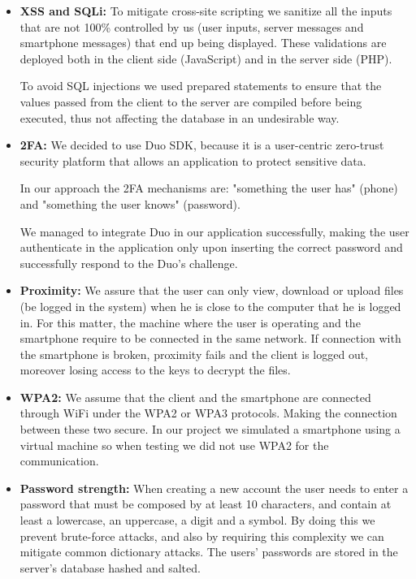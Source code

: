 \documentclass[12pt]{article}
\begin{document}
\begin{itemize}

 \item \textbf{XSS and SQLi:} 
  To mitigate cross-site scripting we sanitize all the inputs that are not 100\% controlled by us (user inputs, server messages and smartphone messages) that end up being displayed. These validations are deployed both in the client side (JavaScript) and in the server side (PHP).

  To avoid SQL injections we used prepared statements to ensure that the values passed from the client to the server are compiled before being executed, thus not affecting the database in an undesirable way.
  
  \item \textbf{2FA:} 
  We decided to use Duo SDK, because it is a user-centric zero-trust security platform that allows an application to protect sensitive data. 
  
  In our approach the 2FA mechanisms are: "something the user has" (phone) and "something the user knows" (password).
  
  We managed to integrate Duo in our application successfully, making the user authenticate in the application only upon inserting the correct password and successfully respond to the Duo's challenge.
  
  \item \textbf{Proximity:}
  We assure that the user can only view, download or upload files (be logged in the system) when he is close to the computer that he is logged in. For this matter, the machine where the user is operating and the smartphone require to be connected in the same network. If connection with the smartphone is broken, proximity fails and the client is logged out, moreover losing access to the keys to decrypt the files.
  
  \item \textbf{WPA2:}
  We assume that the client and the smartphone are connected through WiFi under the WPA2 or WPA3 protocols. Making the connection between these two secure. In our project we simulated a smartphone using a virtual machine so when testing we did not use WPA2 for the communication.

  \item \textbf{Password strength:} 
  When creating a new account the user needs to enter a password that must be composed by at least 10 characters, and contain at least a lowercase, an uppercase, a digit and a symbol. By doing this we prevent brute-force attacks, and also by requiring this complexity we can mitigate common dictionary attacks. The users' passwords are stored in the server's database hashed and salted.


\end{itemize}
\end{document}
